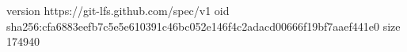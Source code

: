 version https://git-lfs.github.com/spec/v1
oid sha256:cfa6883eefb7c5e5e610391c46bc052e146f4c2adacd00666f19bf7aaef441e0
size 174940
